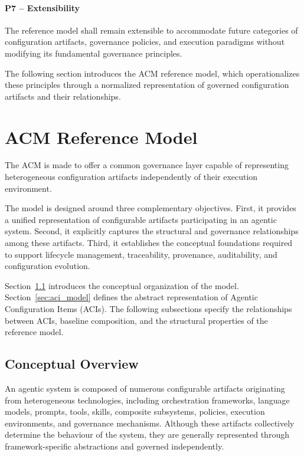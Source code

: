 \documentclass[10pt]{article}
\begin{document}
\paragraph{P7 -- Extensibility}

The reference model shall remain extensible to accommodate future categories of configuration artifacts, governance policies, and execution paradigms without modifying its fundamental governance principles.


The following section introduces the ACM reference model, which operationalizes these principles through a normalized representation of governed configuration artifacts and their relationships.

\section{ACM Reference Model}
\label{sec:reference_model}

The ACM is made to offer a common governance layer capable of representing heterogeneous configuration artifacts independently of their execution environment.

The model is designed around three complementary objectives. First, it provides a unified representation of configurable artifacts participating in an agentic system. Second, it explicitly captures the structural and governance relationships among these artifacts. Third, it establishes the conceptual foundations required to support lifecycle management, traceability, provenance, auditability, and configuration evolution.

Section~\ref{sec:conceptual_overview} introduces the conceptual organization of the model. Section~\ref{sec:aci_model} defines the abstract representation of Agentic Configuration Items (ACIs). The following subsections specify the relationships between ACIs, baseline composition, and the structural properties of the reference model.


\subsection{Conceptual Overview}
\label{sec:conceptual_overview}

An agentic system is composed of numerous configurable artifacts originating from heterogeneous technologies, including orchestration frameworks, language models, prompts, tools, skills, composite subsystems, policies, execution environments, and governance mechanisms. Although these artifacts collectively determine the behaviour of the system, they are generally represented through framework-specific abstractions and governed independently.
\end{document}
